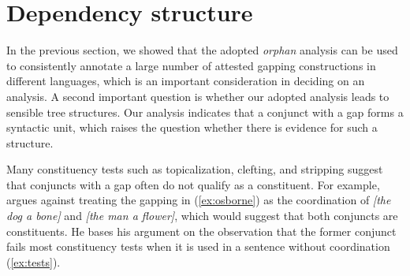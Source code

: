\documentclass[11pt]{article}
\newcounter{excounter}
\begin{document}
%  
%
%   

\section{Dependency structure}
\label{sec:structure}

In the previous section, we showed that the adopted \textit{orphan} analysis can be used to consistently annotate a large number of attested gapping constructions in different languages, which is an important consideration in deciding on an analysis. A second important question is whether our adopted analysis leads to sensible tree structures. Our analysis indicates that a conjunct with a gap forms a syntactic unit, which raises the question whether there is evidence for such a structure. 

Many constituency tests such as topicalization, clefting, and stripping suggest that conjuncts with a gap often do not qualify as a constituent. For example,  argues against treating the gapping in (\ref{ex:osborne}) as the coordination of \textit{[the dog a bone]} and \textit{[the man a flower]}, which would suggest that both conjuncts are constituents. He bases his argument on the observation that the former conjunct fails most constituency tests when it is used in a sentence without coordination (\ref{ex:tests}).
\end{document}
